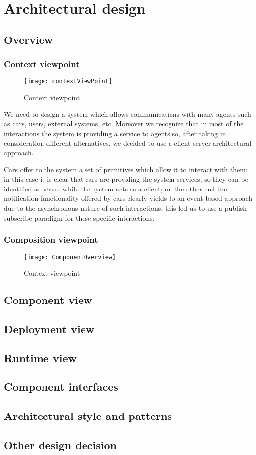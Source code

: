 \section{Architectural design}

\subsection{Overview}
	\subsubsection{Context viewpoint}
	
		\begin{figure}[h!]
			\centering
			\texttt{[image: contextViewPoint]}
			\caption{
				\label{fig:contextViewPoint} 
				Context viewpoint
			}
		\end{figure}
		
		We need to design a system which allows communications with many agents such as cars, users, external systems, etc.
		Moreover we recognize that in most of the interactions the system is providing a service to agents so, after taking in consideration different alternatives, we decided to use a client-server architectural approach.
		
		Cars offer to the system a set of primitives which allow it to interact with them: in this case it is clear that cars are providing the system services, so they can be identified as serves while the system acts as a client; on the other end the notification functionality offered by cars clearly yields to an event-based approach due to the asynchronous nature of such interactions, this led us to use a publish-subscribe paradigm for these specific interactions.
		\clearpage
		
	\subsubsection{Composition viewpoint}
	
		\begin{figure}[h!]
			\centering
			\texttt{[image: ComponentOverview]}
			\caption{
				\label{fig:contextViewPoint} 
				Context viewpoint
			}
		\end{figure}
		
		

\subsection{Component view}
\subsection{Deployment view}
\subsection{Runtime view}
\subsection{Component interfaces}
\subsection{Architectural style and patterns}
\subsection{Other design decision}
